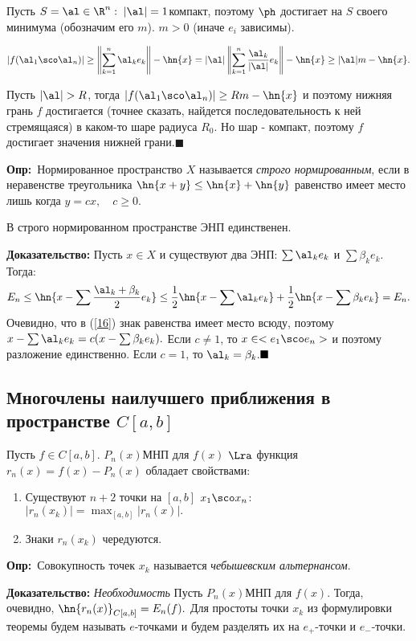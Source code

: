 \documentclass[a4paper]{article}
\def\defin{\noindent\textbf{Опр:}\ }
\begin{document}
Пусть $S={\al\in\R ^n:\;|\al|=1}$\т компакт, поэтому
$\ph$ достигает на $S$ своего минимума (обозначим его $m$). $m>0$
(иначе $e_i$ зависимы).

$$|f(\al_1\sco \al_n)|\ge\left\|\sum_{k=1}^n \al_k
e_k\right\|-\hn{x}=|\al|\left\|\sum_{k=1}^n
\frac{\al_k}{|\al|} e_k\right\|-\hn{x}\ge|\al| m-\hn{x}.$$

Пусть $|\al|>R$, тогда $|f(\al_1\sco \al_n)|\ge
Rm-\hn{x}$ и поэтому нижняя грань $f$ достигается (точнее сказать,
найдется последовательность к ней стремящаяся) в каком-то шаре
радиуса $R_0$. Но шар - компакт, поэтому $f$ достигает значения
нижней грани.$\blacksquare$

\defin Нормированное пространство $X$ называется \emph{строго нормированным}, если в
неравенстве треугольника $\hn{x+y}\le\hn{x}+\hn{y}$ равенство имеет место лишь когда $y=cx, \quad c\ge0$.

\begin{theorems} В строго нормированном пространстве ЭНП
единственен.
\end{theorems}
\textbf{Доказательство:} Пусть $x\in X$ и существуют два ЭНП:
$\sum\al_k e_k$ и $\sum\beta_k e_k.$ Тогда:
\begin{equation}\label{16}
E_n\le\hn{x-\sum\frac{\al_k+\beta_k}2e_k}\le\frac12\hn{x-\sum\al_k e_k}+\frac12\hn{x-\sum\beta_k e_k}=E_n.
\end{equation}
Очевидно, что в (\ref{16}) знак равенства имеет место всюду,
поэтому $x-\sum\al_k e_k=c(x-\sum\beta_k e_k).$ Если $c\neq1$,
то $x\in<e_1\sco e_n>$ и поэтому разложение единственно. Если
$c=1$, то $\al_k=\beta_k.\blacksquare$

\subsection{Многочлены наилучшего приближения в пространстве $C[a,b]$}
\begin{theorems}[Чебышев]
Пусть $f\in C[a,b]$. $P_n(x)$\т МНП для $f(x)$ $\Lra$
функция $r_n(x)=f(x)-P_n(x)$ обладает свойствами:
\begin{enumerate}
\item
Существуют $n+2$ точки на $[a,b]$ $x_1\sco x_n$:
$|r_n(x_k)|=\max_{[a,b]}|r_n(x)|.$
\item
Знаки $r_n(x_k)$ чередуются.
\end{enumerate}
\end{theorems}
\defin Совокупность точек $x_k$ называется
\emph{чебышевским альтернансом}.

\medskip\noindent\textbf{Доказательство:} \emph{Необходимость}
Пусть $P_n(x)$\т МНП для $f(x)$. Тогда, очевидно,
$\hn{r_n(x)}_{C[a,b]}=E_n(f).$ Для простоты точки $x_k$ из
формулировки теоремы будем называть $e$-точками и будем разделять
их на $e_+$-точки и $e_-$-точки.
\end{document}
